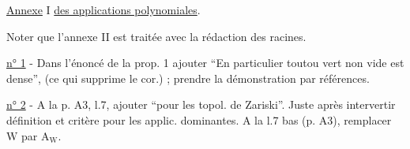 \uline{Annexe} I \uline{des applications polynomiales}.

Noter que l'annexe II est traitée avec la rédaction des racines.

\uline{n° 1} - Dans l'énoncé de la prop. 1 ajouter ``En particulier toutou vert non vide est dense'', (ce qui supprime le cor.) ; prendre la démonstration par références.

\uline{n° 2} - A la p. A3, l.7, ajouter ``pour les topol. de Zariski''. Juste après intervertir définition et critère pour les applic. dominantes. A la l.7 bas (p. A3), remplacer $\mathrm{W}$ par $\mathrm{A}_{\mathrm W}$.

